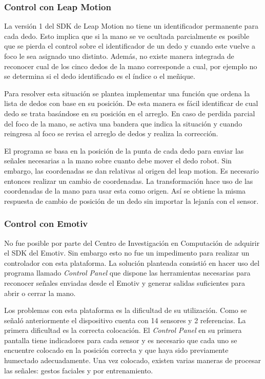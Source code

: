\documentclass[letterpaper,journal,transmag]{IEEEtran}
\begin{document}
\subsubsection{Control con Leap Motion}
La versión 1 del SDK de Leap Motion no tiene un identificador permanente para
cada dedo. Esto implica que si la mano se ve ocultada parcialmente es posible
que se pierda el control sobre el identificador de un dedo y cuando este vuelve
a foco le sea asignado uno distinto. Además, no existe manera integrada de
reconocer cual de los cinco dedos de la mano corresponde a cual, por ejemplo no
se determina si el dedo identificado es el índice o el meñique.

Para resolver esta situación se plantea implementar una función que ordena la
lista de dedos con base en su posición. De esta manera es fácil identificar
de cual dedo se trata basándose en su posición en el arreglo. En caso de
perdida parcial del foco de la mano, se activa una bandera que indica la
situación y cuando reingresa al foco se revisa el arreglo de dedos y realiza la
corrección.

El programa se basa en la posición de la punta de cada dedo para enviar las
señales necesarias a la mano sobre cuanto debe mover el dedo robot. Sin
embargo, las coordenadas se dan relativas al origen del leap motion. Es
necesario entonces realizar un cambio de coordenadas. La transformación hace
uso de las coordenadas de la mano para usar esta como origen. Así se obtiene la
misma respuesta de cambio de posición de un dedo sin importar la lejanía con el
sensor.\\

\subsubsection{Control con Emotiv}
No fue posible por parte del Centro de Investigación en Computación de adquirir
el SDK del Emotiv. Sin embargo esto no fue un impedimento para realizar un
controlador con esta plataforma. La solución planteada consistió en hacer uso
del programa llamado \emph{Control Panel} que dispone las herramientas
necesarias para reconocer señales enviadas desde el Emotiv y generar salidas
suficientes para abrir o cerrar la mano.

Los problemas con esta plataforma es la dificultad de su utilización. Como se
señaló anteriormente el dispositivo cuenta con 14 sensores y 2 referencias. La
primera dificultad es la correcta colocación. El \emph{Control Panel} en su
primera pantalla tiene indicadores para cada sensor y es necesario que cada uno
se encuentre colocado en la posición correcta y que haya sido previamente
humectado adecuadamente. Una vez colocado, existen varias maneras de procesar
las señales: gestos faciales y por entrenamiento.
\end{document}
